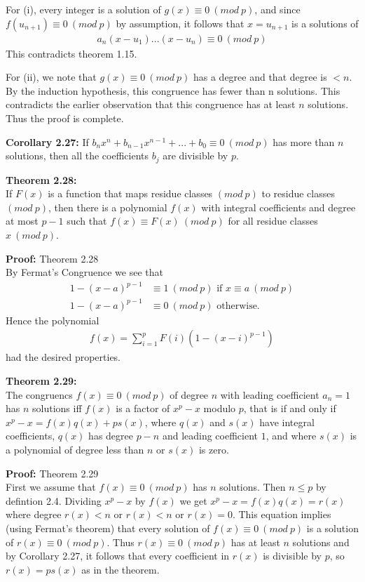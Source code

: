 \documentclass[a4paper]{article}
\begin{document}
For (i), every integer is a solution of $g(x)\equiv 0\ (mod\ p)$, and since
$f(u_{n+1})\equiv 0\ (mod\ p)$ by assumption, it follows that $x=u_{n+1}$ is a
solutions of
\begin{align}
    a_n(x-u_1)...(x-u_n)\equiv 0\ (mod\ p)
\end{align}
This contradicts theorem 1.15.

For (ii), we note that $g(x)\equiv 0\ (mod\ p)$ has a degree and that degree is
$<n$. By the induction hypothesis, this congruence has fewer than n solutions. This
contradicts the earlier observation that this congruence has at least $n$ solutions.
Thus the proof is complete.

\textbf{Corollary 2.27:}
If $b_nx^n+b_{n-1}x^{n-1}+...+b_0\equiv 0\ (mod\ p)$ has more than $n$ solutions,
then all the coefficients $b_j$ are divisible by $p$.

\textbf{Theorem 2.28:}\\
If $F(x)$ is a function that maps residue classes $(mod\ p)$ to residue classes
$(mod\ p)$, then there is a polynomial $f(x)$ with integral coefficients and
degree at most $p-1$ such that $f(x)\equiv F(x)\ (mod\ p)$ for all residue
classes $x\ (mod\ p)$.

\textbf{Proof:} Theorem 2.28\\
By Fermat's Congruence we see that
\begin{align}
    1-(x-a)^{p-1}&\equiv 1\ (mod\ p)\text{ if } x\equiv a\ (mod\ p)\\
    1-(x-a)^{p-1}&\equiv 0\ (mod\ p) \text{ otherwise.}
\end{align}
Hence the polynomial
\begin{align}
    f(x)=\sum^p_{i=1}F(i)(1-(x-i)^{p-1})
\end{align}
had the desired properties.

\textbf{Theorem 2.29:}\\
The congruencs $f(x)\equiv 0\ (mod\ p)$ of degree $n$ with leading coefficient
$a_n=1$ has $n$ solutions iff $f(x)$ is a factor of $x^p-x$ modulo $p$, that is
if and only if $x^p-x=f(x)q(x)+ps(x)$, where $q(x)$ and $s(x)$ have integral
coefficients, $q(x)$ has degree $p-n$ and leading coefficient $1$, and where
$s(x)$ is a polynomial of degree less than $n$ or $s(x)$ is zero.

\textbf{Proof:} Theorem 2.29\\
First we assume that $f(x)\equiv 0\ (mod\ p)$ has $n$ solutions. Then $n\leq p$
by defintion 2.4. Dividing $x^p-x$ by $f(x)$ we get $x^p-x=f(x)q(x)=r(x)$ where
degree $r(x)<n$ or $r(x)<n$ or $r(x)=0$. This equation implies
(using Fermat's theorem) that every solution of $f(x)\equiv 0\ (mod\ p)$ is a
solution of $r(x)\equiv 0\ (mod\ p)$. Thus $r(x)\equiv 0\ (mod\ p)$ has at least
$n$ solutions and by Corollary 2.27, it follows that every coefficient in $r(x)$
is divisible by $p$, so $r(x)=ps(x)$ as in the theorem.
\end{document}
